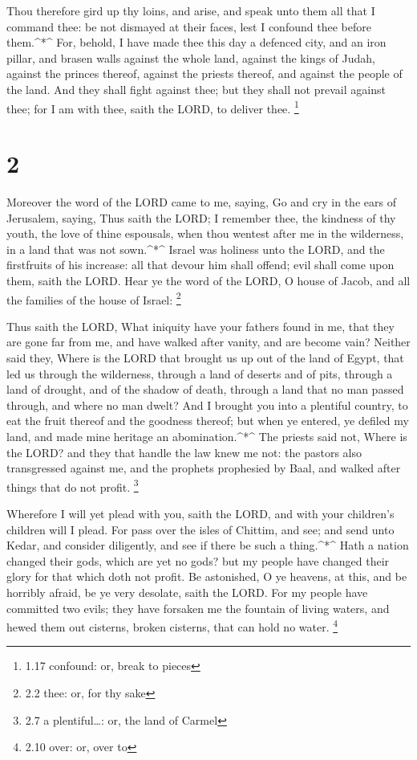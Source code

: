  Thou therefore gird up thy loins, and arise, and speak
unto them all that I command thee: be not dismayed at their faces, lest
I confound thee before them.\^{}*\^{}  For, behold, I have
made thee this day a defenced city, and an iron pillar, and brasen walls
against the whole land, against the kings of Judah, against the princes
thereof, against the priests thereof, and against the people of the
land.  And they shall fight against thee; but they shall
not prevail against thee; for I am with thee, saith the LORD, to deliver
thee. \footnote{1.17 confound: or, break to pieces}

\hypertarget{section-1}{%
\section{2}\label{section-1}}

 Moreover the word of the LORD came to me, saying,
 Go and cry in the ears of Jerusalem, saying, Thus saith the
LORD; I remember thee, the kindness of thy youth, the love of thine
espousals, when thou wentest after me in the wilderness, in a land that
was not sown.\^{}*\^{}  Israel was holiness unto the LORD,
and the firstfruits of his increase: all that devour him shall offend;
evil shall come upon them, saith the LORD.  Hear ye the word
of the LORD, O house of Jacob, and all the families of the house of
Israel: \footnote{2.2 thee: or, for thy sake}

 Thus saith the LORD, What iniquity have your fathers found
in me, that they are gone far from me, and have walked after vanity, and
are become vain?  Neither said they, Where is the LORD that
brought us up out of the land of Egypt, that led us through the
wilderness, through a land of deserts and of pits, through a land of
drought, and of the shadow of death, through a land that no man passed
through, and where no man dwelt?  And I brought you into a
plentiful country, to eat the fruit thereof and the goodness thereof;
but when ye entered, ye defiled my land, and made mine heritage an
abomination.\^{}*\^{}  The priests said not, Where is the
LORD? and they that handle the law knew me not: the pastors also
transgressed against me, and the prophets prophesied by Baal, and walked
after things that do not profit. \footnote{2.7 a plentiful\ldots: or,
  the land of Carmel}

 Wherefore I will yet plead with you, saith the LORD, and
with your children's children will I plead.  For pass over
the isles of Chittim, and see; and send unto Kedar, and consider
diligently, and see if there be such a thing.\^{}*\^{} 
Hath a nation changed their gods, which are yet no gods? but my people
have changed their glory for that which doth not profit. 
Be astonished, O ye heavens, at this, and be horribly afraid, be ye very
desolate, saith the LORD.  For my people have committed two
evils; they have forsaken me the fountain of living waters, and hewed
them out cisterns, broken cisterns, that can hold no water. \footnote{2.10
  over: or, over to}

